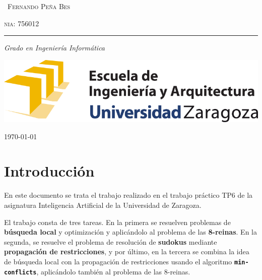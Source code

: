 \documentclass[a4paper, 10pt]{report}
\begin{document}
\begin{titlepage}
	{\scshape\ \Large Fernando Peña Bes} %
	
	\vspace{0.5\baselineskip} %
	
	{\scshape \large nia: 756012} %
	
	\vspace{0\baselineskip} %
	
	\rule{0.2\textwidth}{0.4pt} %

	
	\textit{\large Grado en Ingeniería Informática} %
	
	\vspace{0.01\baselineskip} %
	
	
	\vfill %
	
	\includegraphics[scale=0.8]{eina}
	\vspace{0.5\baselineskip}

		
	{\large \today} %
	
\end{titlepage}

\tableofcontents




\chapter*{Introducción}
 

En este documento se trata el trabajo realizado en el trabajo práctico TP6 de la asignatura Inteligencia Artificial de la Universidad de Zaragoza.

El trabajo consta de tres tareas. En la primera se resuelven problemas de \textbf{búsqueda local} y optimización y aplicándolo al problema de las \textbf{8-reinas}. En la segunda, se resuelve el problema de resolución de \textbf{sudokus} mediante \textbf{propagación de restricciones}, y por último, en la tercera se combina la idea de búsqueda local con la propagación de restricciones usando el algoritmo \textbf{\texttt{min-conflicts}}, aplicándolo también al problema de las 8-reinas.
\end{document}
